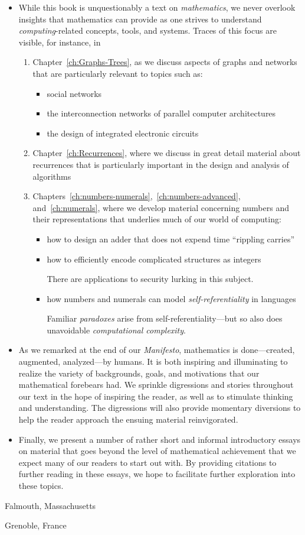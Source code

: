\begin{itemize}
\item
While this book is unquestionably a text on {\em mathematics}, we
never overlook insights that mathematics can provide as one strives to
understand {\em computing}-related concepts, tools, and systems.
Traces of this focus are visible, for instance, in
  \begin{enumerate}
  \item
Chapter~\ref{ch:Graphs-Trees}, as we discuss aspects of graphs and
networks that are particularly relevant to topics such as:
     \begin{itemize}
     \item
social networks
     \item
the interconnection networks of parallel computer architectures
     \item
the design of integrated electronic circuits
     \end{itemize}
  \item
Chapter~\ref{ch:Recurrences}, where we discuss in great detail
material about recurrences that is particularly important in the
design and analysis of algorithms
  \item
Chapters~\ref{ch:numbers-numerals},~\ref{ch:numbers-advanced},
and~\ref{ch:numerals}, where we develop material concerning numbers
and their representations that underlies much of our world of
computing:
     \begin{itemize}
     \item
how to design an adder that does not expend time ``rippling carries''
     \item
how to efficiently encode complicated structures as integers

There are applications to security lurking in this subject.
     \item
how numbers and numerals can model {\em self-referentiality} in
languages

Familiar {\it paradoxes} arise from self-referentiality---but so also
does unavoidable {\em computational complexity}.
     \end{itemize}
  \end{enumerate}
\item
As we remarked at the end of our {\it Manifesto}, mathematics is
done---created, augmented, analyzed---by humans.  It is both inspiring
and illuminating to realize the variety of backgrounds, goals, and
motivations that our mathematical forebears had.  We sprinkle
digressions and stories throughout our text in the hope of inspiring
the reader, as well as to stimulate thinking and understanding.  The
digressions will also provide momentary diversions to help the reader
approach the ensuing material reinvigorated.

\item
Finally, we present a number of rather short and informal introductory
essays on material that goes beyond the level of mathematical
achievement that we expect many of our readers to start out with.  By
providing citations to further reading in these essays, we hope to
facilitate further exploration into these topics.
\end{itemize}

\bigskip

\hfill Falmouth, Massachusetts

\hfill Grenoble, France



